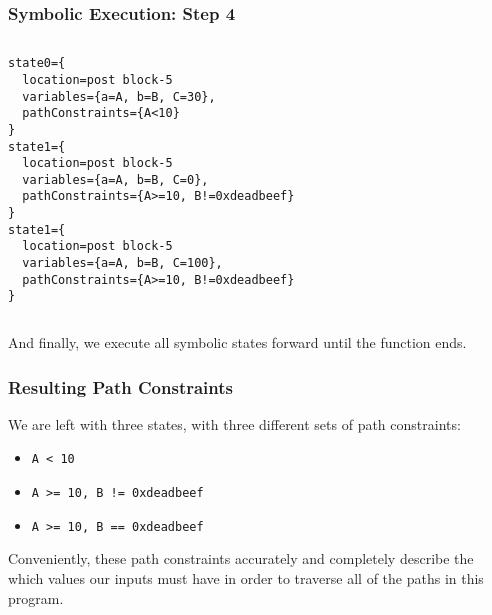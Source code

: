 \documentclass{beamer}
\def\code#1{\scriptsize{\texttt{#1}}}
\begin{document}
\begin{frame}[fragile]
\frametitle{Symbolic Execution: Step 4}
\begin{columns}
  \begin{lstlisting}[basicstyle=\tiny]
state0={
  location=post block-5
  variables={a=A, b=B, C=30},
  pathConstraints={A<10}
}
state1={
  location=post block-5
  variables={a=A, b=B, C=0},
  pathConstraints={A>=10, B!=0xdeadbeef}
}
state1={
  location=post block-5
  variables={a=A, b=B, C=100},
  pathConstraints={A>=10, B!=0xdeadbeef}
}
  \end{lstlisting}
\end{columns}
And finally, we execute all symbolic states forward until the function ends.
\end{frame}

\begin{frame}
\frametitle{Resulting Path Constraints}
We are left with three states, with three different sets of path constraints:

\begin{itemize}
  \item \texttt{{A < 10}}
  \item \texttt{{A >= 10, B != 0xdeadbeef}}
  \item \texttt{{A >= 10, B == 0xdeadbeef}}
\end{itemize}

Conveniently, these path constraints accurately and completely describe the which values our inputs must have in order to traverse all of the paths in this program.
\end{frame}
\end{document}
